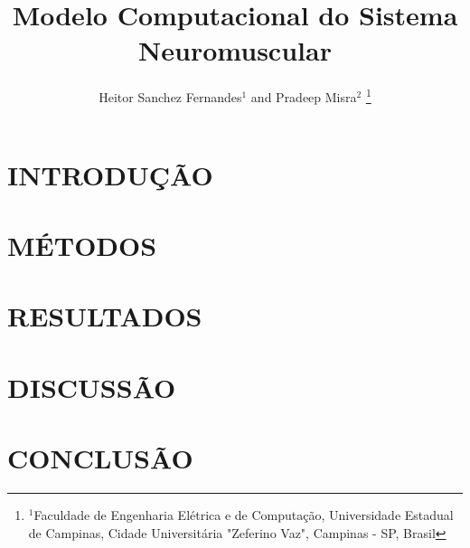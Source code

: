 \documentclass[a4paper, 10pt, conference]{ieeeconf}       %
\title{\LARGE \bf
Modelo Computacional do Sistema Neuromuscular
}
\author{Heitor Sanchez Fernandes$^{1}$ and Pradeep Misra$^{2}$%
\thanks{$^{1}$Faculdade de Engenharia Elétrica e de Computação,
        Universidade Estadual de Campinas, Cidade Universitária "Zeferino Vaz", Campinas - SP, Brasil}%
}
\begin{document}
\maketitle
\thispagestyle{empty}
\pagestyle{empty}


\begin{abstract}

\end{abstract}

\section{INTRODUÇÃO}


\section{MÉTODOS}


\section{RESULTADOS}


\section{DISCUSSÃO}


\section{CONCLUSÃO}



\addtolength{\textheight}{-12cm}   %



\end{document}
